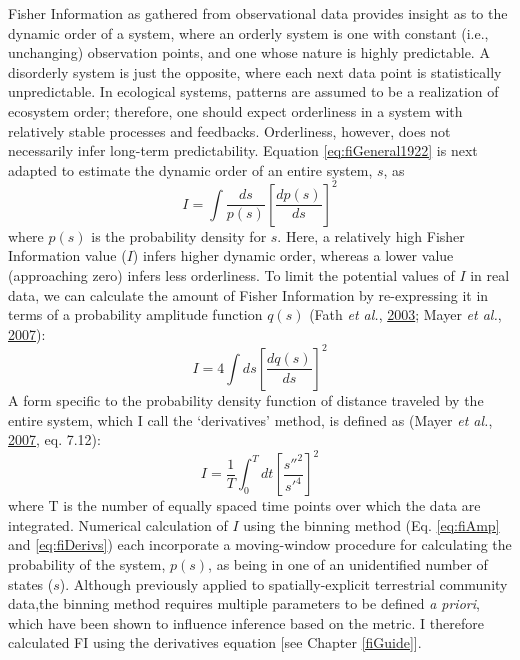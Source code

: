 \documentclass[print]{nuthesis}
\begin{document}
Fisher Information as gathered from observational data provides insight as to the dynamic order of a system, where an orderly system is one with constant (i.e., unchanging) observation points, and one whose nature is highly predictable. A disorderly system is just the opposite, where each next data point is statistically unpredictable. In ecological systems, patterns are assumed to be a realization of ecosystem order; therefore, one should expect orderliness in a system with relatively stable processes and feedbacks. Orderliness, however, does not necessarily infer long-term predictability. Equation \eqref{eq:fiGeneral1922} is next adapted to estimate the dynamic order of an entire system, \(s\), as
\begin{equation} 
  I = \int \frac{ds}{p(s)}\left[\frac{dp(s)}{ds}\right]^2
  \label{eq:fi73c}
\end{equation}
where \(p(s)\) is the probability density for \(s\). Here, a relatively high Fisher Information value (\(I\)) infers higher dynamic order, whereas a lower value (approaching zero) infers less orderliness. To limit the potential values of \(I\) in real data, we can calculate the amount of Fisher Information by re-expressing it in terms of a probability amplitude function \(q(s)\) (Fath \emph{et al.}, \protect\hyperlink{ref-fath_regime_2003}{2003}; Mayer \emph{et al.}, \protect\hyperlink{ref-mayer_applications_2007}{2007}):
\begin{equation}
  I = 4 \int ds\left[\frac{dq(s)}{ds}\right]^2
  \label{eq:fiAmp}
\end{equation}
A form specific to the probability density function of distance traveled by the entire system, which I call the `derivatives' method, is defined as (Mayer \emph{et al.}, \protect\hyperlink{ref-mayer_applications_2007}{2007}, eq. 7.12):
\begin{equation}
  I = \frac{1}{T} \int_0^T dt\left[\frac{s''^2}{s'^4}\right]^2
  \label{eq:fiDerivs}
\end{equation}
where T is the number of equally spaced time points over which the data are integrated. Numerical calculation of \(I\) using the binning method (Eq. \eqref{eq:fiAmp} and \eqref{eq:fiDerivs}) each incorporate a moving-window procedure for calculating the probability of the system, \(p(s)\), as being in one of an unidentified number of states (\(s\)). Although previously applied to spatially-explicit terrestrial community data,the binning method requires multiple parameters to be defined \emph{a priori}, which have been shown to influence inference based on the metric. I therefore calculated FI using the derivatives equation {[}see Chapter \ref{fiGuide}{]}.
\end{document}
